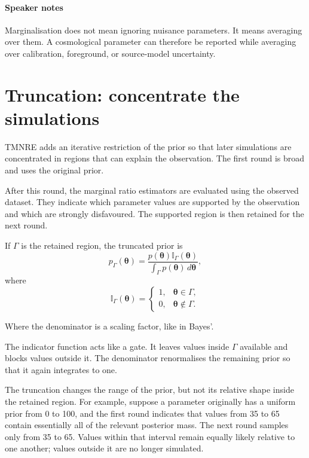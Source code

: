﻿\documentclass[13pt,a4paper]{article}
\begin{document}
\paragraph{Speaker notes}

Marginalisation does not mean ignoring nuisance parameters. It means averaging over them. A cosmological parameter can therefore be reported while averaging over calibration, foreground, or source-model uncertainty.

\section*{Truncation: concentrate the simulations}TMNRE adds an iterative restriction of the prior so that later simulations are concentrated in regions that can explain the observation. The first round is broad and uses the original prior.

After this round, the marginal ratio estimators are evaluated using the observed dataset. They indicate which parameter values are supported by the observation and which are strongly disfavoured. The supported region is then retained for the next round.

If $\Gamma$ is the retained region, the truncated prior is
\begin{equation}
p_{\Gamma}(\bm{\theta})=
\frac{p(\bm{\theta})\mathbb{I}_{\Gamma}(\bm{\theta})}
{\displaystyle \int_{\Gamma}p(\bm{\theta})\,d\bm{\theta}},
\end{equation}
where
\[
\mathbb{I}_{\Gamma}(\bm{\theta})=
\begin{cases}
1,&\bm{\theta}\in\Gamma,\\
0,&\bm{\theta}\notin\Gamma.
\end{cases}
\]

Where the denominator is a scaling factor, like in Bayes'.

The indicator function acts like a gate. It leaves values inside $\Gamma$ available and blocks values outside it. The denominator renormalises the remaining prior so that it again integrates to one.

The truncation changes the range of the prior, but not its relative shape inside the retained region. For example, suppose a parameter originally has a uniform prior from 0 to 100, and the first round indicates that values from 35 to 65 contain essentially all of the relevant posterior mass. The next round samples only from 35 to 65. Values within that interval remain equally likely relative to one another; values outside it are no longer simulated.
\end{document}
